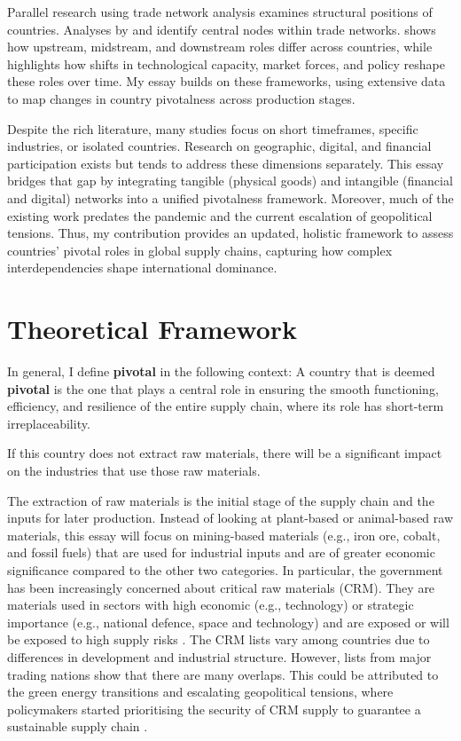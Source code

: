 \documentclass[11pt]{article}
\def\highlight#1#2{
	\begin{centering}
    
		\vspace{1.2ex}
		\begin{minipage}{0.8\linewidth}
			\begin{tcolorbox}[
				boxsep=3.3pt,
				boxrule=0.4pt,
				colback=white,
				colbacktitle=white,
				coltitle=black,
				colframe=black,
				title=\centering \textbf{#1},
			]
				\centering
				#2
			\end{tcolorbox}
		\end{minipage}
		\vspace{1.2ex}
        
	\end{centering}
}
\begin{document}
Parallel research using trade network analysis examines structural positions of countries. Analyses by \citet{de2014network} and \citet{deguchi2014hubs} identify central nodes within trade networks. \citet{cingolani2017} shows how upstream, midstream, and downstream roles differ across countries, while \citet{alves2022} highlights how shifts in technological capacity, market forces, and policy reshape these roles over time. My essay builds on these frameworks, using extensive data to map changes in country pivotalness across production stages.

Despite the rich literature, many studies focus on short timeframes, specific industries, or isolated countries. Research on geographic, digital, and financial participation exists but tends to address these dimensions separately. This essay bridges that gap by integrating tangible (physical goods) and intangible (financial and digital) networks into a unified pivotalness framework. Moreover, much of the existing work predates the pandemic and the current escalation of geopolitical tensions. Thus, my contribution provides an updated, holistic framework to assess countries’ pivotal roles in global supply chains, capturing how complex interdependencies shape international dominance.


\section{Theoretical Framework}
\label{sec:theory}

In general, I define \textbf{pivotal} in the following context: A country that is deemed \textbf{pivotal} is the one that plays a central role in ensuring the smooth functioning, efficiency, and resilience of the entire supply chain, where its role has short-term irreplaceability. 

\highlight{Pivotal Type 1: Raw Materials}{If this country does not extract raw materials, there will be a significant impact on the industries that use those raw materials.}

The extraction of raw materials is the initial stage of the supply chain and the inputs for later production. Instead of looking at plant-based or animal-based raw materials, this essay will focus on mining-based materials (e.g., iron ore, cobalt, and fossil fuels) that are used for industrial inputs and are of greater economic significance compared to the other two categories. In particular, the government has been increasingly concerned about critical raw materials (CRM). They are materials used in sectors with high economic (e.g., technology) or strategic importance (e.g., national defence, space and technology) and are exposed or will be exposed to high supply risks \citep{european2023}. The CRM lists vary among countries due to differences in development and industrial structure. However, lists from major trading nations show that there are many overlaps. This could be attributed to the green energy transitions and escalating geopolitical tensions, where policymakers started prioritising the security of CRM supply to guarantee a sustainable supply chain \citep{kowalski2023}.
 
\end{document}
